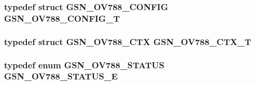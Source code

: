 \hypertarget{a00537_a22a37c1e556e0ca8d35c488ab3589319}{
\subsubsection[{GSN\_\-OV788\_\-CONFIG\_\-T}]{\setlength{\rightskip}{0pt plus 5cm}typedef struct {\bf GSN\_\-OV788\_\-CONFIG} {\bf GSN\_\-OV788\_\-CONFIG\_\-T}}}
\label{a00537_a22a37c1e556e0ca8d35c488ab3589319}
\hypertarget{a00537_aba3a60421c8b885cc0dc9d7931274351}{
\subsubsection[{GSN\_\-OV788\_\-CTX\_\-T}]{\setlength{\rightskip}{0pt plus 5cm}typedef struct {\bf GSN\_\-OV788\_\-CTX} {\bf GSN\_\-OV788\_\-CTX\_\-T}}}
\label{a00537_aba3a60421c8b885cc0dc9d7931274351}
\hypertarget{a00537_ad1eec137ad450b79f2207a5a6e87d9ac}{
\subsubsection[{GSN\_\-OV788\_\-STATUS\_\-E}]{\setlength{\rightskip}{0pt plus 5cm}typedef enum {\bf GSN\_\-OV788\_\-STATUS} {\bf GSN\_\-OV788\_\-STATUS\_\-E}}}
\label{a00537_ad1eec137ad450b79f2207a5a6e87d9ac}


